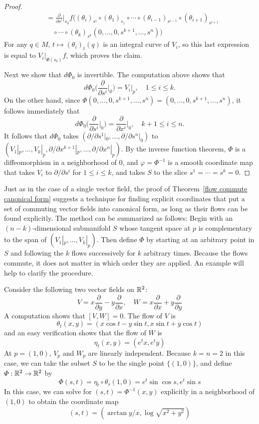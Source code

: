 \begin{proof}
\begin{align*}
&=\frac{\partial}{\partial s^i}\Big|_{s_0}f\big((\theta_i)_{s^i}\circ(\theta_1)_{s_1}\circ\cdots\circ(\theta_{i-1})_{s^{i-1}}\circ(\theta_{i+1})_{s^{i+1}}\\
&\quad\circ\cdots\circ(\theta_k)_{s^k}(0,\dots,0,s^{k+1},\dots,s^n)\big)
\end{align*}
For any $q\in M$, $t\mapsto(\theta_i)_t(q)$ is an integral curve of $V_i$, so this last expression is equal to $V_i|_{\varPhi(s_0)}f$, which proves the claim.\par
Next we show that $d\varPhi_0$ is invertible. The computation above shows that
\[d\varPhi_{0}\Big(\frac{\partial}{\partial s^i}\Big|_{0}\Big)=V_i|_p,\quad 1\leq i\leq k.\]
On the other hand, since $\varPhi(0,\dots,0,s^{k+1},\dots,s^n)=(0,\dots,0,s^{k+1},\dots,s^n)$, it follows immediately that
\[d\varPhi_{0}\Big(\frac{\partial}{\partial s^i}\Big|_{0}\Big)=\frac{\partial}{\partial x^i}\Big|_{0},\quad k+1\leq i\leq n.\]
It follows that $d\varPhi_0$ takes $(\partial/\partial s^1|_0,\dots,\partial/\partial s^n|_0)$ to $(V_1|_p,\dots,V_k|_p,\partial/\partial x^{k+1}|_p,\dots,\partial/\partial x^n|_p)$. By the inverse function theorem, $\varPhi$ is a diffeomorphism in a neighborhood of $0$, and $\varphi=\varPhi^{-1}$ is a smooth
coordinate map that takes $V_i$ to $\partial/\partial s^i$ for $1\leq i\leq k$, and takes $S$ to the slice $s^1=\cdots=s^k=0$.
\end{proof}
Just as in the case of a single vector field, the proof of Theorem~\ref{flow commute canonical form} suggests a technique for finding explicit coordinates that put a set of commuting vector fields into canonical form, as long as their flows can be found explicitly. The method can be summarized as follows: Begin with an $(n-k)$-dimensional submanifold $S$ whose tangent space at $p$ is complementary to the span of $(V_1|_p,\dots,V_k|_p)$. Then define $\varPhi$ by starting at an arbitrary point in $S$ and following the $k$ flows successively for $k$ arbitrary times. Because the flows commute, it does not matter in which order they are applied. An example will help to clarify the procedure.
\begin{example}\label{commute vector field eg}
Consider the following two vector fields on $\mathbb{R}^2$:
\[V=x\frac{\partial}{\partial y}-y\frac{\partial}{\partial x},\quad W=x\frac{\partial}{\partial x}+y\frac{\partial}{\partial y}\]
A computation shows that $[V,W]=0$. The flow of $V$ is
\[\theta_t(x,y)=(x\cos t-y\sin t,x\sin t+y\cos t)\]
and an easy verification shows that the flow of $W$ is
\[\eta_t(x,y)=(e^tx,e^ty)\]
At $p=(1,0)$, $V_p$ and $W_p$ are linearly independent. Because $k=n=2$ in this case, we can take the subset $S$ to be the single point $\{(1,0)\}$, and define $\varPhi:\mathbb{R}^2\to\mathbb{R}^2$ by
\[\varPhi(s,t)=\eta_t\circ\theta_s(1,0)=e^t\sin\cos s,e^t\sin s\]
In this case, we can solve for $(s,t)=\varPhi^{-1}(x,y)$ explicitly in a neighborhood of $(1,0)$ to obtain the coordinate map
\[(s,t)=(\arctan y/x,\log\sqrt{x^2+y^2})\]
\end{example}
